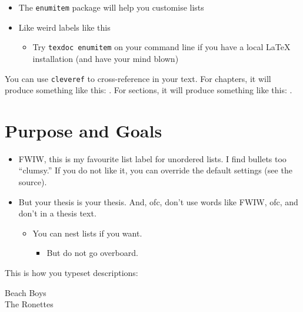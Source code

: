 \documentclass[11pt,titlepage,openright]{book}
\begin{document}
\begin{itemize}[label=\leftpointright]
\item The \texttt{enumitem} package will help you customise lists
\item Like weird labels like this
  \begin{itemize}
  \item Try \texttt{texdoc enumitem} on your command line if you
    have a local \LaTeX{} installation (and have your mind blown)
  \end{itemize}
\end{itemize}

You can use \texttt{cleveref} to cross-reference in your text.
For chapters, it will produce something like this: .
For sections, it will produce something like this: .

\lipsum[3]

\section{Purpose and Goals}
\label{sec:purpose-goals}

\lipsum[4-6]

\begin{itemize}
\item FWIW, this is my favourite list label for unordered lists. I
  find bullets too ``clumsy.'' If you do not like it, you can
  override the default settings (see the source).
\item But your thesis is your thesis. And, ofc, don't use words
  like FWIW, ofc, and don't in a thesis text.

  \begin{itemize}
  \item You can nest lists if you want.

    \begin{itemize}
    \item But do not go overboard.
    \end{itemize}

  \end{itemize}
  
\end{itemize}

This is how you typeset descriptions:

\begin{description}
\item[Beach Boys] \lipsum[1]
\item[The Ronettes] \lipsum[2]
\end{description}
\end{document}
